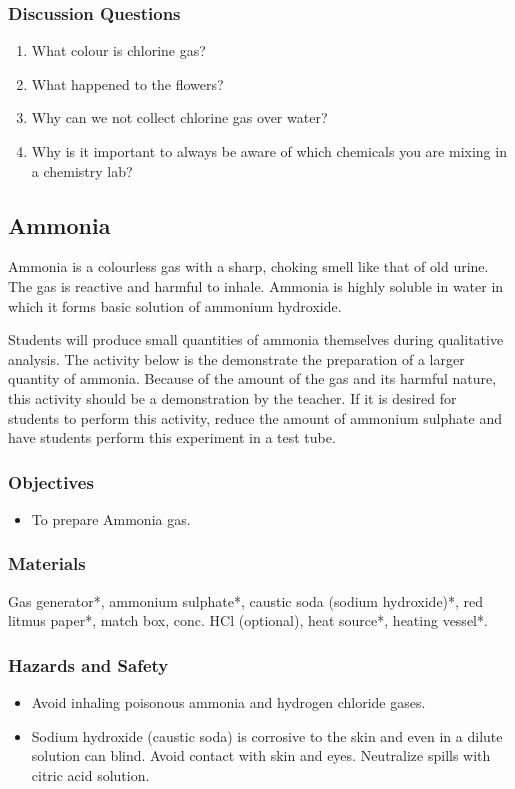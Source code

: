 \subsubsection*{Discussion Questions}
\begin{enumerate}
\item{What colour is chlorine gas?}
\item{What happened to the flowers?}
\item{Why can we not collect chlorine gas over water?}
\item{Why is it important to always be aware of which chemicals you are mixing in a chemistry lab?}
\end{enumerate}

\subsection{Ammonia}

Ammonia is a colourless gas with a sharp, choking smell like that of old urine. The gas is reactive and harmful to inhale. Ammonia is highly soluble in water in which it forms basic solution of ammonium hydroxide.

Students will produce small quantities of ammonia themselves during qualitative analysis. The activity below is the demonstrate the preparation of a larger quantity of ammonia. Because of the amount of the gas and its harmful nature, this activity should be a demonstration by the teacher. If it is desired for students to perform this activity, reduce the amount of ammonium sulphate and have students perform this experiment in a test tube.

\subsubsection*{Objectives}
\begin{itemize}
\item{To prepare Ammonia gas}.
\end{itemize}

\subsubsection*{Materials}
Gas generator*, ammonium sulphate*, caustic soda (sodium hydroxide)*, red litmus paper*, match box, conc. HCl (optional), heat source*, heating vessel*.

\subsubsection*{Hazards and Safety}
\begin{itemize}
\item{Avoid inhaling poisonous ammonia and hydrogen chloride gases.}
\item{Sodium hydroxide (caustic soda) is corrosive to the skin and even in a dilute solution can blind. Avoid contact with skin and eyes. Neutralize spills with citric acid solution.}
\end{itemize}

